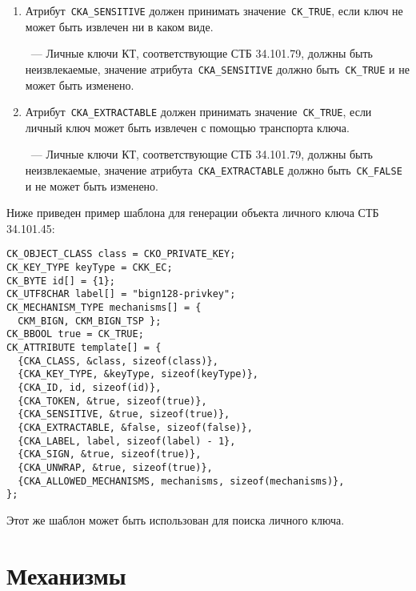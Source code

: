 \begin{enumerate}
\item
Атрибут~\verb|CKA_SENSITIVE| должен принимать значение~\verb|CK_TRUE|,
если ключ не может быть извлечен ни в каком виде.

\begin{note}
~---
Личные ключи КТ, соответствующие СТБ 34.101.79, должны быть неизвлекаемые,
значение атрибута~\verb|CKA_SENSITIVE| должно быть~\verb|CK_TRUE| и
не может быть изменено.
\end{note}

\item
Атрибут~\verb|CKA_EXTRACTABLE| должен принимать значение~\verb|CK_TRUE|,
если личный ключ может быть извлечен с помощью транспорта ключа.

\begin{note}
~---
Личные ключи КТ, соответствующие СТБ 34.101.79, должны быть неизвлекаемые,
значение атрибута~\verb|CKA_EXTRACTABLE| должно быть~\verb|CK_FALSE| и
не может быть изменено.
\end{note}

\end{enumerate}

Ниже приведен пример шаблона для генерации объекта личного ключа СТБ 34.101.45:
\begin{verbatim}
CK_OBJECT_CLASS class = CKO_PRIVATE_KEY;
CK_KEY_TYPE keyType = CKK_EC;
CK_BYTE id[] = {1};
CK_UTF8CHAR label[] = "bign128-privkey";
CK_MECHANISM_TYPE mechanisms[] = {
  CKM_BIGN, CKM_BIGN_TSP };
CK_BBOOL true = CK_TRUE;
CK_ATTRIBUTE template[] = {
  {CKA_CLASS, &class, sizeof(class)},
  {CKA_KEY_TYPE, &keyType, sizeof(keyType)},
  {CKA_ID, id, sizeof(id)},
  {CKA_TOKEN, &true, sizeof(true)},
  {CKA_SENSITIVE, &true, sizeof(true)},
  {CKA_EXTRACTABLE, &false, sizeof(false)},
  {CKA_LABEL, label, sizeof(label) - 1},
  {CKA_SIGN, &true, sizeof(true)},
  {CKA_UNWRAP, &true, sizeof(true)},
  {CKA_ALLOWED_MECHANISMS, mechanisms, sizeof(mechanisms)},
};
\end{verbatim}

Этот же шаблон может быть использован для поиска личного ключа.

\section{Механизмы}
                                                                                                                 
